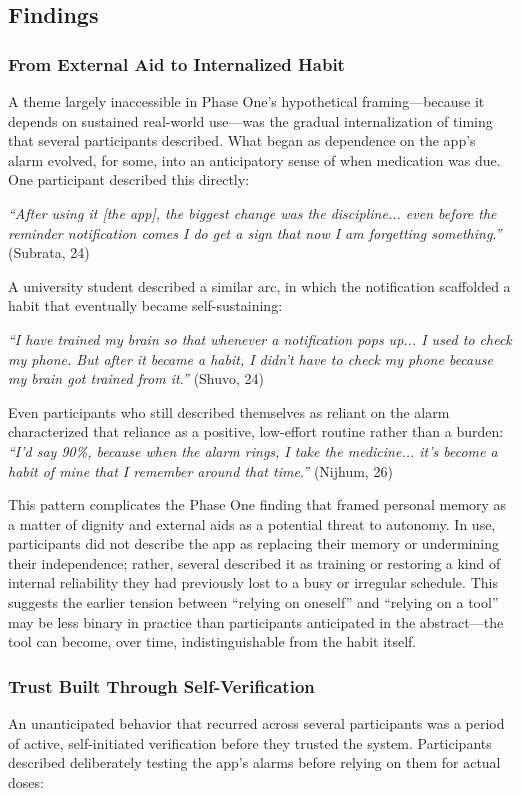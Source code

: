 \documentclass[acmlarge]{acmart}
\begin{document}
\subsection{Findings}

\subsubsection{From External Aid to Internalized Habit}
A theme largely inaccessible in Phase One's hypothetical framing---because
it depends on sustained real-world use---was the gradual internalization of
timing that several participants described. What began as dependence on the
app's alarm evolved, for some, into an anticipatory sense of when medication
was due. One participant described this directly:

\emph{``After using it [the app], the biggest change was the discipline...
even before the reminder notification comes I do get a sign that now I am
forgetting something.''} (Subrata, 24)

A university student described a similar arc, in which the notification
scaffolded a habit that eventually became self-sustaining:

\emph{``I have trained my brain so that whenever a notification pops up...
I used to check my phone. But after it became a habit, I didn't have to
check my phone because my brain got trained from it.''} (Shuvo, 24)

Even participants who still described themselves as reliant on the alarm
characterized that reliance as a positive, low-effort routine rather than a
burden: \emph{``I'd say 90\%, because when the alarm rings, I take the
medicine... it's become a habit of mine that I remember around that
time.''} (Nijhum, 26)

This pattern complicates the Phase One finding that framed personal memory
as a matter of dignity and external aids as a potential threat to autonomy.
In use, participants did not describe the app as replacing their memory or
undermining their independence; rather, several described it as training or
restoring a kind of internal reliability they had previously lost to a busy
or irregular schedule. This suggests the earlier tension between
``relying on oneself'' and ``relying on a tool'' may be less binary in
practice than participants anticipated in the abstract---the tool can
become, over time, indistinguishable from the habit itself.

\subsubsection{Trust Built Through Self-Verification}
An unanticipated behavior that recurred across several participants was a
period of active, self-initiated verification before they trusted the
system. Participants described deliberately testing the app's alarms before
relying on them for actual doses:
\end{document}
